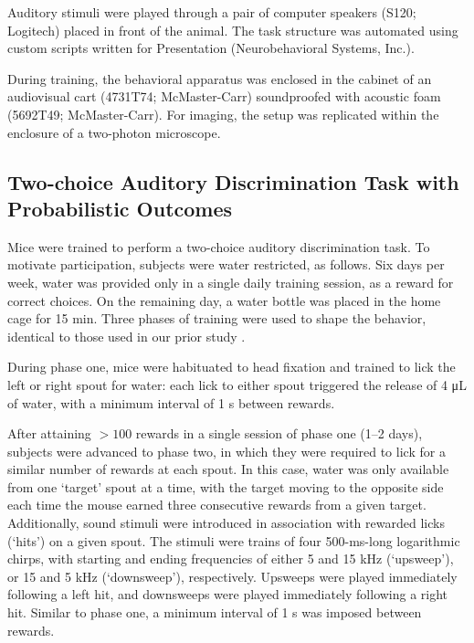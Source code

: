 Auditory stimuli were played through a pair of computer speakers (S120; Logitech) placed in front of the animal. The task structure was automated using custom scripts written for Presentation (Neurobehavioral Systems, Inc.). 

During training, the behavioral apparatus was enclosed in the cabinet of an audiovisual cart (4731T74; McMaster-Carr) soundproofed with acoustic foam (5692T49; McMaster-Carr). For imaging, the setup was replicated within the enclosure of a two-photon microscope.

\subsection*{Two-choice Auditory Discrimination Task with Probabilistic Outcomes}
Mice were trained to perform a two-choice auditory discrimination task. To motivate participation, subjects were water restricted, as follows. Six days per week, water was provided only in a single daily training session, as a reward for correct choices. On the remaining day, a water bottle was placed in the home cage for 15 min. Three phases of training were used to shape the behavior, identical to those used in our prior study \citep{siniscalchi2016fast}. 

During phase one, mice were habituated to head fixation and trained to lick the left or right spout for water: each lick to either spout triggered the release of 4 \unit{\micro\liter} of water, with a minimum interval of 1 s between rewards. 

After attaining $>100$ rewards in a single session of phase one (1–2 days), subjects were advanced to phase two, in which they were required to lick for a similar number of rewards at each spout. In this case, water was only available from one ‘target’ spout at a time, with the target moving to the opposite side each time the mouse earned three consecutive rewards from a given target. Additionally, sound stimuli were introduced in association with rewarded licks (‘hits’) on a given spout. The stimuli were trains of four 500-ms-long logarithmic chirps, with starting and ending frequencies of either 5 and 15 kHz (‘upsweep’), or 15 and 5 kHz (‘downsweep’), respectively. Upsweeps were played immediately following a left hit, and downsweeps were played immediately following a right hit. Similar to phase one, a minimum interval of 1 s was imposed between rewards. 

